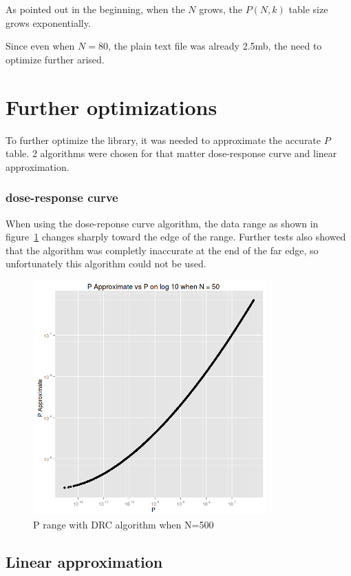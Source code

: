 \documentclass[12pt]{article}
\begin{document}
As pointed out in the beginning, when the $N$ grows, the $P(N, k)$ table size grows exponentially.

Since even when $N = 80$, the plain text file was already 2.5mb, the need to optimize further arised.

\section{Further optimizations}

To further optimize the library, it was needed to approximate the accurate $P$ table. 2 algorithms were chosen for that matter dose-response curve and linear approximation.

\subsubsection{dose-response curve}
When using the dose-reponse curve algorithm, the data range as shown in figure~\ref{fig:PdivPapproxDrcWhenN500} changes sharply toward the edge of the range. Further tests also showed that the algorithm was completly inaccurate at the end of the far edge, so unfortunately this algorithm could not be used.

\begin{figure}[!h]
  \centering
  \includegraphics[width=0.8\textwidth]{PvsP50}
  \caption{P range with DRC algorithm when N=500}
  \label{fig:PdivPapproxDrcWhenN500}
\end{figure}

\subsection{Linear approximation}
\end{document}
